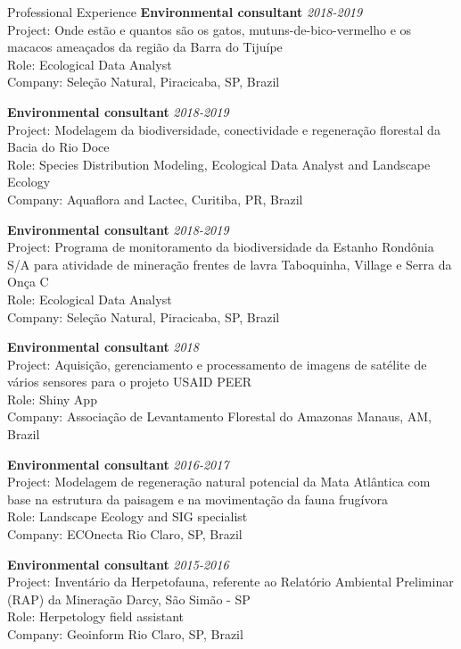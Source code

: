 \documentclass{resume}
\begin{document}
\begin{rSection}{Professional Experience}
{\bf Environmental consultant} \hfill{\em 2018-2019} \\ 
Project: Onde estão e quantos são os gatos, mutuns-de-bico-vermelho e os macacos ameaçados da região da Barra do Tijuípe \\ 
Role: Ecological Data Analyst \\ 
Company: Seleção Natural, Piracicaba, SP, Brazil

{\bf Environmental consultant} \hfill{\em 2018-2019} \\ 
Project: Modelagem da biodiversidade, conectividade e regeneração florestal da Bacia do Rio Doce \\ 
Role: Species Distribution Modeling, Ecological Data Analyst and Landscape Ecology\\ 
Company: Aquaflora and Lactec, Curitiba, PR, Brazil

{\bf Environmental consultant} \hfill{\em 2018-2019} \\ 
Project: Programa de monitoramento da biodiversidade da Estanho Rondônia S/A para atividade de mineração frentes de lavra Taboquinha, Village e Serra da Onça C \\ 
Role: Ecological Data Analyst \\ 
Company: Seleção Natural, Piracicaba, SP, Brazil

{\bf Environmental consultant} \hfill{\em 2018} \\ 
Project: Aquisição, gerenciamento e processamento de imagens de satélite de vários sensores para o projeto USAID PEER \\ 
Role: Shiny App \\ 
Company: Associação de Levantamento Florestal do Amazonas Manaus, AM, Brazil

{\bf Environmental consultant} \hfill{\em 2016-2017} \\ 
Project: Modelagem de regeneração natural potencial da Mata Atlântica com base na estrutura da paisagem e na movimentação da fauna frugívora \\ 
Role: Landscape Ecology and SIG specialist \\ 
Company: ECOnecta Rio Claro, SP, Brazil

{\bf Environmental consultant} \hfill{\em 2015-2016} \\
Project: Inventário da Herpetofauna, referente ao Relatório Ambiental Preliminar (RAP) da Mineração Darcy, São Simão - SP \\ 
Role: Herpetology field assistant \\ 
Company: Geoinform Rio Claro, SP, Brazil

\end{rSection}
\end{document}
